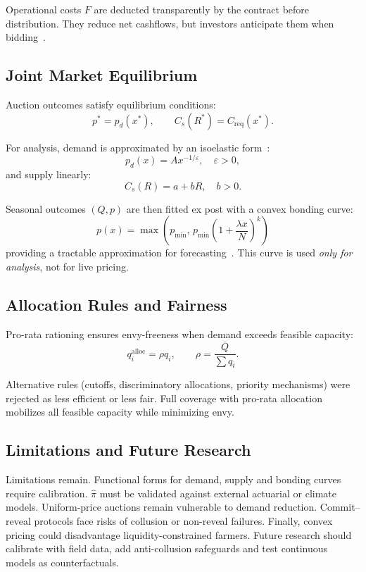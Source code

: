\documentclass[11pt,a4paper]{article}
\begin{document}
		Operational costs $F$ are deducted transparently by the contract before distribution.
		They reduce net cashflows, but investors anticipate them when bidding~\parencite{bowers1997actuarial}.

		\subsection{Joint Market Equilibrium}\label{subsec:joint-market-equilibrium}

		Auction outcomes satisfy equilibrium conditions:
		\[
			p^\ast = p_d(x^\ast), \qquad C_s(R^\ast) = C_{\mathrm{req}}(x^\ast).
		\]

		For analysis, demand is approximated by an isoelastic form~\parencite{mascolell1995microeconomic,varian1992micro}:
		\[
			p_d(x) = A x^{-1/\varepsilon}, \quad \varepsilon > 0,
		\]
		and supply linearly:
		\[
			C_s(R) = a + bR, \quad b > 0.
		\]

		Seasonal outcomes $(Q,p)$ are then fitted ex post with a convex bonding curve:
		\[
			p(x) = \max\left(p_{\min},\, p_{\min}\left(1+\frac{\lambda x}{N}\right)^k\right)
		\]
		providing a tractable approximation for forecasting~\parencite{angeris2020improved,shiller2003bond}.
		This curve is used \emph{only for analysis}, not for live pricing.

		\subsection{Allocation Rules and Fairness}\label{subsec:allocation-rules-and-fairness}

		Pro-rata rationing ensures envy-freeness when demand exceeds feasible capacity:
		\[
			q_i^{\text{alloc}} = \rho q_i, \qquad \rho = \frac{\bar{Q}}{\sum q_i}.
		\]

		Alternative rules (cutoffs, discriminatory allocations, priority mechanisms) were rejected as less efficient or less fair.
		Full coverage with pro-rata allocation mobilizes all feasible capacity while minimizing envy.

		\subsection{Limitations and Future Research}\label{subsec:limitations-and-future-research}

		Limitations remain.
		Functional forms for demand, supply and bonding curves require calibration. $\hat{\pi}$ must be validated against external actuarial or climate models.
		Uniform-price auctions remain vulnerable to demand reduction.
		Commit--reveal protocols face risks of collusion or non-reveal failures.
		Finally, convex pricing could disadvantage liquidity-constrained farmers.
		Future research should calibrate with field data, add anti-collusion safeguards and test continuous models as counterfactuals.
\end{document}
